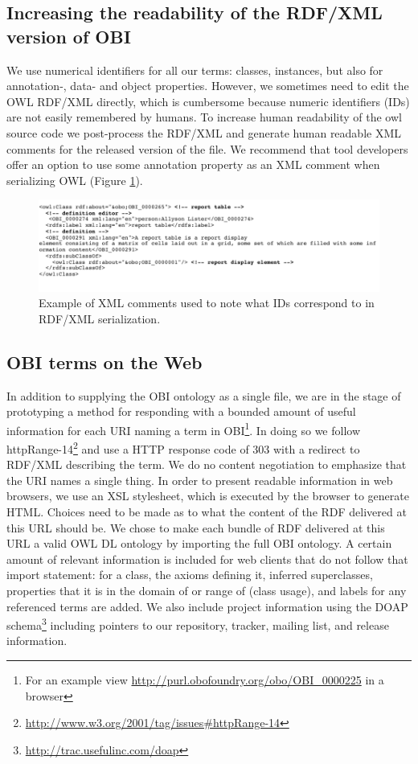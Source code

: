 \documentclass{elsart}       %
\begin{document}
\subsection{Increasing the readability of the RDF/XML version of OBI}

We use numerical identifiers for all our terms: classes, instances, but also for annotation-, data- and object properties.
However, we sometimes need to edit the OWL RDF/XML directly, which is cumbersome because numeric identifiers (IDs) are not easily remembered by humans.
To increase human readability of the owl source code we post-process the RDF/XML and generate human readable XML comments for the released version of the file.
We recommend that tool developers offer an option to use some annotation property as an XML comment when serializing OWL (Figure \ref{fig:comments}).  

\begin{figure}[t]
\centering \includegraphics*[width=1\columnwidth]{comments}
\caption{Example of XML comments used to note what IDs correspond to in RDF/XML serialization.}
\label{fig:comments}
\end{figure}

\subsection{OBI terms on the Web}

In addition to supplying the OBI ontology as a single file, we are in the stage of prototyping a method for responding with a bounded amount of useful information for each URI naming a term in OBI\footnote{For an example view \url{http://purl.obofoundry.org/obo/OBI_0000225} in a browser}.
In doing so we follow httpRange-14\footnote{\url{http://www.w3.org/2001/tag/issues#httpRange-14}} and use a HTTP response code of 303 with a redirect to RDF/XML describing the term.
We do no content negotiation to emphasize that the URI names a single thing.
In order to present readable information in web browsers, we use an XSL stylesheet, which is executed by the browser to generate HTML.
Choices need to be made as to what the content of the RDF delivered at this URL should be.
We chose to make each bundle of RDF delivered at this URL a valid OWL DL ontology by importing the full OBI ontology.
A certain amount of relevant information is included for web clients that do not follow that import statement: for a class, the axioms defining it, inferred superclasses, properties that it is in the domain of or range of (class usage), and labels for any referenced terms are added.
We also include project information using the DOAP schema\footnote{\url{http://trac.usefulinc.com/doap}} including pointers to our repository, tracker, mailing list, and release information. 
\end{document}
